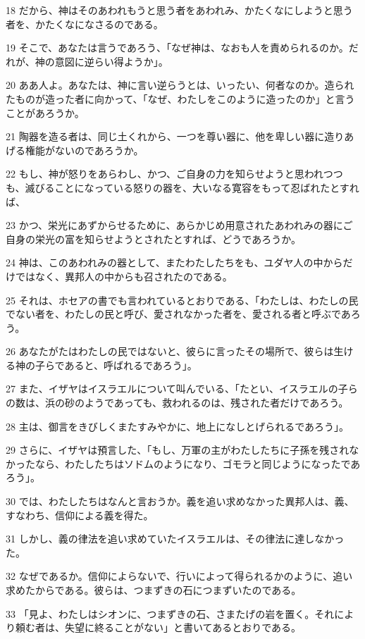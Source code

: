 \par 18 だから、神はそのあわれもうと思う者をあわれみ、かたくなにしようと思う者を、かたくなになさるのである。
\par 19 そこで、あなたは言うであろう、「なぜ神は、なおも人を責められるのか。だれが、神の意図に逆らい得ようか」。
\par 20 ああ人よ。あなたは、神に言い逆らうとは、いったい、何者なのか。造られたものが造った者に向かって、「なぜ、わたしをこのように造ったのか」と言うことがあろうか。
\par 21 陶器を造る者は、同じ土くれから、一つを尊い器に、他を卑しい器に造りあげる権能がないのであろうか。
\par 22 もし、神が怒りをあらわし、かつ、ご自身の力を知らせようと思われつつも、滅びることになっている怒りの器を、大いなる寛容をもって忍ばれたとすれば、
\par 23 かつ、栄光にあずからせるために、あらかじめ用意されたあわれみの器にご自身の栄光の富を知らせようとされたとすれば、どうであろうか。
\par 24 神は、このあわれみの器として、またわたしたちをも、ユダヤ人の中からだけではなく、異邦人の中からも召されたのである。
\par 25 それは、ホセアの書でも言われているとおりである、「わたしは、わたしの民でない者を、わたしの民と呼び、愛されなかった者を、愛される者と呼ぶであろう。
\par 26 あなたがたはわたしの民ではないと、彼らに言ったその場所で、彼らは生ける神の子らであると、呼ばれるであろう」。
\par 27 また、イザヤはイスラエルについて叫んでいる、「たとい、イスラエルの子らの数は、浜の砂のようであっても、救われるのは、残された者だけであろう。
\par 28 主は、御言をきびしくまたすみやかに、地上になしとげられるであろう」。
\par 29 さらに、イザヤは預言した、「もし、万軍の主がわたしたちに子孫を残されなかったなら、わたしたちはソドムのようになり、ゴモラと同じようになったであろう」。
\par 30 では、わたしたちはなんと言おうか。義を追い求めなかった異邦人は、義、すなわち、信仰による義を得た。
\par 31 しかし、義の律法を追い求めていたイスラエルは、その律法に達しなかった。
\par 32 なぜであるか。信仰によらないで、行いによって得られるかのように、追い求めたからである。彼らは、つまずきの石につまずいたのである。
\par 33 「見よ、わたしはシオンに、つまずきの石、さまたげの岩を置く。それにより頼む者は、失望に終ることがない」と書いてあるとおりである。

